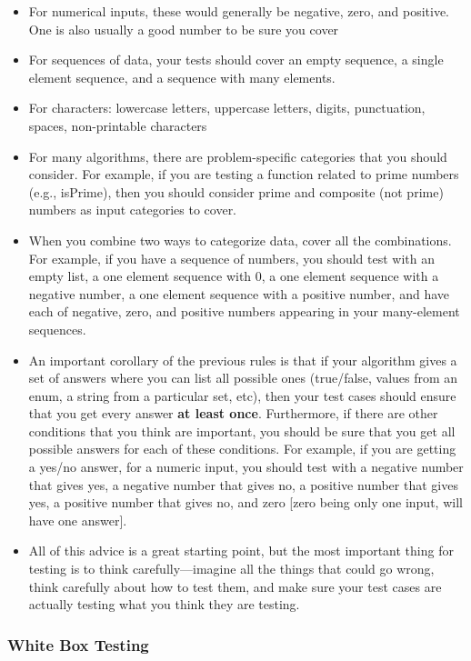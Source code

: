 \documentclass[11pt, a4paper]{article}
\begin{document}
\begin{itemize}
  \item For numerical inputs, these would generally be negative, zero, and positive. One is also usually a good number to be sure you cover
  \item For sequences of data, your tests should cover an empty sequence, a single element sequence, and a sequence with many elements.
  \item For characters: lowercase letters, uppercase letters, digits, punctuation, spaces, non-printable characters
  \item For many algorithms, there are problem-specific categories that you should consider. For example, if you are testing a function related to prime numbers (e.g., isPrime), then you should consider prime and composite (not prime) numbers as input categories to cover.
  \item When you combine two ways to categorize data, cover all the combinations. For example, if you have a sequence of numbers, you should test with an empty list, a one element sequence with 0, a one element sequence with a negative number, a one element sequence with a positive number, and have each of negative, zero, and positive numbers appearing in your many-element sequences.
  \item An important corollary of the previous rules is that if your algorithm gives a set of answers where you can list all possible ones (true/false, values from an enum, a string from a particular set, etc), then your test cases should ensure that you get every answer \textbf{at least once}. Furthermore, if there are other conditions that you think are important, you should be sure that you get all possible answers for each of these conditions. For example, if you are getting a yes/no answer, for a numeric input, you should test with a negative number that gives yes, a negative number that gives no, a positive number that gives yes, a positive number that gives no, and zero [zero being only one input, will have one answer].
  \item All of this advice is a great starting point, but the most important thing for testing is to think carefully---imagine all the things that could go wrong, think carefully about how to test them, and make sure your test cases are actually testing what you think they are testing.
\end{itemize}




\subsubsection{White Box Testing}%
\label{ssub:white_box_testing}
\end{document}
